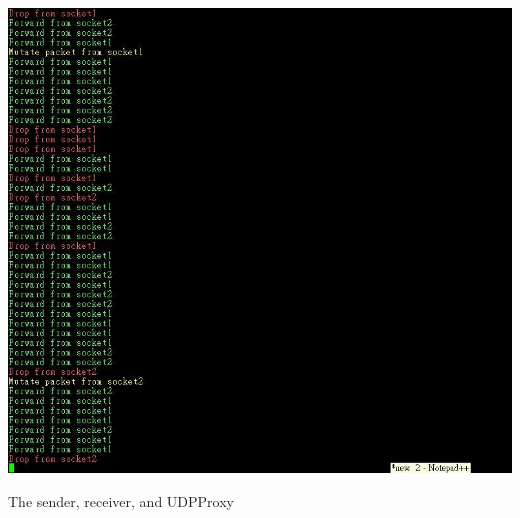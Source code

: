 \documentclass[10pt,a4paper]{article}
\begin{document}
\begin{center}
\includegraphics[scale=0.8]{shotproxy.jpg}
\end{center}
\begin{center}
{\small The sender, receiver, and UDPProxy}
\end{center}
\end{document}
